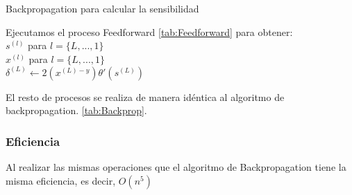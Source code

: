 \begin{algorithm}[H]
   \caption{Backpropagation para calcular la sensibilidad}
   Ejecutamos el proceso Feedforward \ref{tab:Feedforward} para obtener:\\
   $s^{(l)}$ para $l = \{L,...,1\}$ \\
   $x^{(l)}$ para $l = \{L,...,1\}$ \\  
   $\delta^{(L)} \gets 2(x^{(L)-y})\theta'(s^{(L)})$ \\
   
\end{algorithm}

El resto de procesos se realiza de manera idéntica al algoritmo de backpropagation. \ref{tab:Backprop}.

\subsubsection{Eficiencia}

Al realizar las mismas operaciones que el algoritmo de Backpropagation tiene la misma eficiencia, es decir, $O(n^{5})$